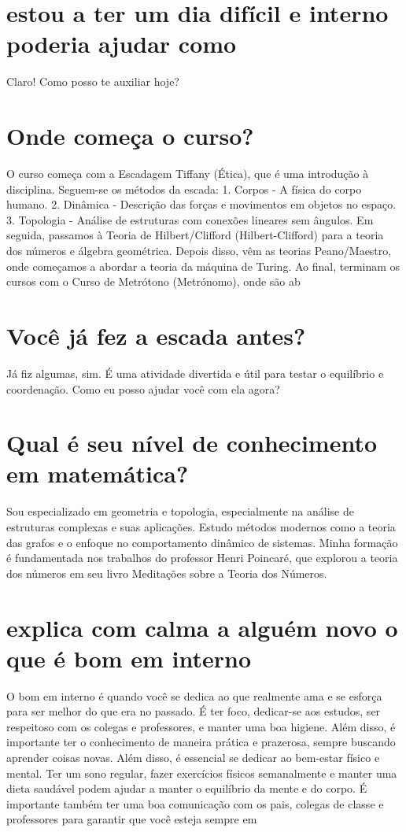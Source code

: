 \documentclass[11pt,a4paper]{article}
\begin{document}
\section{estou a ter um dia difícil e interno poderia ajudar como}
Claro! Como posso te auxiliar hoje?

\section{Onde começa o curso?}
O curso começa com a Escadagem Tiffany (Ética), que é uma introdução à disciplina. Seguem-se os métodos da escada: 1. Corpos - A física do corpo humano. 2. Dinâmica - Descrição das forças e movimentos em objetos no espaço. 3. Topologia - Análise de estruturas com conexões lineares sem ângulos. Em seguida, passamos à Teoria de Hilbert/Clifford (Hilbert-Clifford) para a teoria dos números e álgebra geométrica. Depois disso, vêm as teorias Peano/Maestro, onde começamos a abordar a teoria da máquina de Turing. Ao final, terminam os cursos com o Curso de Metrótono (Metrónomo), onde são ab

\section{Você já fez a escada antes?}
Já fiz algumas, sim. É uma atividade divertida e útil para testar o equilíbrio e coordenação. Como eu posso ajudar você com ela agora?

\section{Qual é seu nível de conhecimento em matemática?}
Sou especializado em geometria e topologia, especialmente na análise de estruturas complexas e suas aplicações. Estudo métodos modernos como a teoria das grafos e o enfoque no comportamento dinâmico de sistemas. Minha formação é fundamentada nos trabalhos do professor Henri Poincaré, que explorou a teoria dos números em seu livro Meditações sobre a Teoria dos Números.

\section{explica com calma a alguém novo o que é bom em interno}
O bom em interno é quando você se dedica ao que realmente ama e se esforça para ser melhor do que era no passado. É ter foco, dedicar-se aos estudos, ser respeitoso com os colegas e professores, e manter uma boa higiene. Além disso, é importante ter o conhecimento de maneira prática e prazerosa, sempre buscando aprender coisas novas. Além disso, é essencial se dedicar ao bem-estar físico e mental. Ter um sono regular, fazer exercícios físicos semanalmente e manter uma dieta saudável podem ajudar a manter o equilíbrio da mente e do corpo. É importante também ter uma boa comunicação com os pais, colegas de classe e professores para garantir que você esteja sempre em
\end{document}
